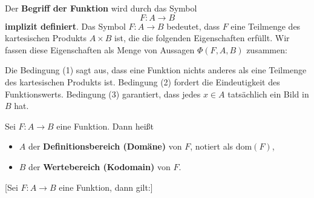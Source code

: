 \documentclass[main.tex]{subfiles}
\begin{document}
\begin{definition}
Der \textbf{Begriff der Funktion} wird durch das Symbol
\[
F\colon A \to B
\]
\textbf{implizit definiert}. 
Das Symbol \(F\colon A\to B\) bedeutet, dass \(F\) eine Teilmenge des kartesischen Produkts \(A\times B\) ist,
die die folgenden Eigenschaften erfüllt. Wir fassen diese Eigenschaften als Menge von Aussagen 
\(\Phi(F,A,B)\) zusammen:
\end{definition}




\begin{remark}
Die Bedingung (1) sagt aus, dass eine Funktion nichts anderes als eine Teilmenge des kartesischen Produkts ist.  
Bedingung (2) fordert die Eindeutigkeit des Funktionswerts.  
Bedingung (3) garantiert, dass jedes \(x\in A\) tatsächlich ein Bild in \(B\) hat.  
\end{remark}

\begin{definition}
Sei \(F\colon A\to B\) eine Funktion. Dann heißt
\begin{itemize}
  \item \(A\) der \textbf{Definitionsbereich (Domäne)} von \(F\), notiert als \(\mathrm{dom}(F)\),
  \item \(B\) der \textbf{Wertebereich (Kodomain)} von \(F\).
\end{itemize}
\end{definition}


[Sei \(F\colon A\to B\) eine Funktion, dann gilt:]
\begin{tabproof}
\end{tabproof}
\end{document}
